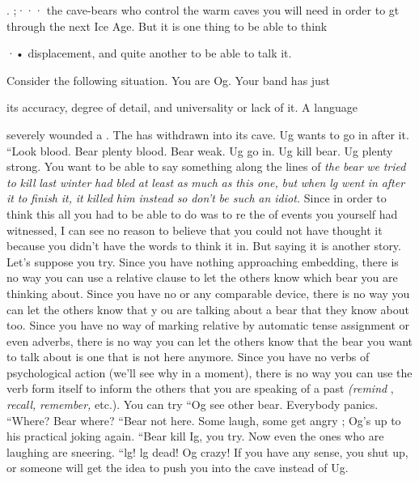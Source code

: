 . ;··· the cave-bears who control the warm caves you will need in order to  gt through the next Ice Age. But it is one thing to be able to think

·• displacement, and quite another to be able to talk it.

 

Consider the following situation. You are Og. Your band has just


its accuracy, degree of detail, and universality or lack of it. A language

severely wounded a . The  has withdrawn into its cave. Ug wants to go in after it. ``Look blood. Bear plenty blood. Bear weak. Ug go in. Ug kill bear. Ug plenty strong. You want to be able to say something along the lines of \textit{the} \textit{bear} \textit{we} \textit{tried} \textit{to} \textit{kill} \textit{last} \textit{winter} \textit{had} \textit{bled} \textit{at} \textit{least} \textit{as} \textit{much} \textit{as} \textit{this one,} \textit{but} \textit{when} \textit{l}\textit{g} \textit{went} \textit{in} \textit{after} \textit{it} \textit{to} \textit{finish} \textit{it,} \textit{it} \textit{killed} \textit{him} \textit{instead} \textit{so} \textit{don't} \textit{be such} \textit{an idiot.} Since in order to think this all you had to be able to do was to re the  of events you yourself had witnessed, I can see no reason to believe that you could not have thought it because you didn't have the words to think it in. But saying it is another story. Let's suppose you try. Since you have nothing approaching embedding, there is no way you can use a relative clause to let the others know which bear you are thinking about. Since you have no  or any comparable device, there is no way you can let the others know that y ou are talking about a bear that they know about too. Since you have no way of marking relative  by automatic tense assignment or even adverbs, there is no way you can let the others know that the bear you want to talk about is one that is not here anymore. Since you have no verbs of psychological action (we'll see why in a moment), there is no way you can use the verb form itself to inform the others that you are speaking of a past  \textit{(remind} , \textit{recall,} \textit{remember,} etc.). You can try ``Og see other bear. Everybody panics. ``Where? Bear where?{\textquotedbl} ``Bear not here. Some laugh, some get angry ; Og's up to his practical joking again. ``Bear kill Ig, you try. Now even the ones who are laughing are sneering. ``lg! lg dead! Og crazy! If you have any sense, you
shut up, or someone will get the idea to push you into the cave instead
of Ug.

